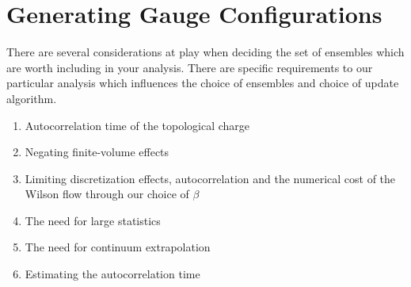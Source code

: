 \documentclass[a4paper,10pt]{book}
\begin{document}
\section{Generating Gauge Configurations}
There are several considerations at play when deciding the set of ensembles which are worth including in your analysis. There are specific requirements to our particular analysis which influences the choice of ensembles and choice of update algorithm.
\begin{enumerate}
\item Autocorrelation time of the topological charge
\item Negating finite-volume effects
\item Limiting discretization effects, autocorrelation and the numerical cost of the Wilson flow through our choice of $\beta$
\item The need for large statistics
\item The need for continuum extrapolation
\item Estimating the autocorrelation time
\end{enumerate}
\end{document}
